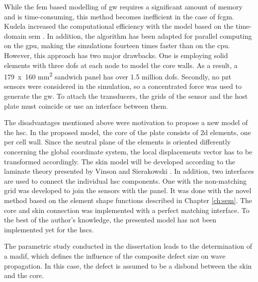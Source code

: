 While the \ac{fem} based modelling of \ac{gw} requires a significant amount of memory and is time-consuming, this method becomes inefficient in the case of \ac{fcgm}.
Kudela increased the computational efficiency with the model based on the time-domain \ac{sem} \cite{kudela2016parallel}.
In addition, the algorithm has been adapted for parallel computing on the \ac{gpu}, making the simulations fourteen times faster than on the \ac{cpu}.
However, this approach has two major drawbacks. One is employing solid elements with three \acp{dof} at each node to model the core walls. As a result, a \unit{179 x 160} \unit{\square\mm} sandwich panel has over 1.5 million \acp{dof}.
Secondly, no \ac{pzt} sensors were considered in the simulation, so a concentrated force was used to generate the \ac{gw}.
To attach the transducers, the grids of the sensor and the host plate must coincide or use an interface between them. 

The disadvantages mentioned above were motivation to propose a new model of the \ac{hsc}.
In the proposed model, the core of the plate consists of \ac{2d} elements, one per cell wall.
Since the neutral plane of the elements is oriented differently concerning the global coordinate system, the local displacements vector has to be transformed accordingly.
The skin model will be developed according to the laminate theory presented by Vinson and Sierakowski \cite{vinson1993behavior}.
In addition, two interfaces are used to connect the individual \ac{hsc} components.
One with the non-matching grid was developed to join the sensors with the panel.
It was done with the novel method based on the element shape functions described in Chapter \ref{ch:sem}.
The core and skin connection was implemented with a perfect matching interface.
To the best of the author's knowledge, the presented model has not been implemented yet for the \acp{hsc}.

The parametric study conducted in the dissertation leads to the determination of a \ac{madif}, which defines the influence of the composite defect size on wave propagation.
In this case, the defect is assumed to be a disbond between the skin and the core.
